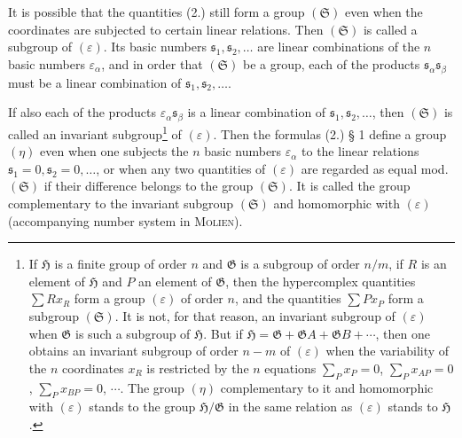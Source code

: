 \documentclass[11pt]{article}
\newcommand{\eps}{\varepsilon}
\begin{document}
It is possible that the quantities (2.) still form a group $(\mathfrak S)$ even when the coordinates are subjected to certain linear relations. Then $(\mathfrak S)$ is called a subgroup of $(\eps)$. Its basic numbers $\mathfrak s_1,\mathfrak s_2,\ldots$ are linear combinations of the $n$ basic numbers $\eps_\alpha$, and in order that $(\mathfrak S)$ be a group, each of the products $\mathfrak s_\alpha\mathfrak s_\beta$ must be a linear combination of $\mathfrak s_1,\mathfrak s_2,\ldots$.

If also each of the products $\eps_\alpha\mathfrak s_\beta$ is a linear combination of $\mathfrak s_1,\mathfrak s_2,\ldots$, then $(\mathfrak S)$ is called an invariant subgroup\footnote{If $\mathfrak H$ is a finite group of order $n$ and $\mathfrak G$ is a subgroup of order $n/m$, if $R$ is an element of $\mathfrak H$ and $P$ an element of $\mathfrak G$, then the hypercomplex quantities $\sum R x_R$ form a group $(\eps)$ of order $n$, and the quantities $\sum P x_P$ form a subgroup $(\mathfrak S)$. It is not, for that reason, an invariant subgroup of $(\eps)$ when $\mathfrak G$ is such a subgroup of $\mathfrak H$. But if $\mathfrak H=\mathfrak G+\mathfrak G A+\mathfrak G B+\cdots$, then one obtains an invariant subgroup of order $n-m$ of $(\eps)$ when the variability of the $n$ coordinates $x_R$ is restricted by the $n$ equations $\sum_P x_P=0$, $\sum_P x_{AP}=0$, $\sum_P x_{BP}=0$, $\cdots$. The group $(\eta)$ complementary to it and homomorphic with $(\eps)$ stands to the group $\mathfrak H/\mathfrak G$ in the same relation as $(\eps)$ stands to $\mathfrak H$.} of $(\eps)$. Then the formulas (2.) § 1 define a group $(\eta)$ even when one subjects the $n$ basic numbers $\eps_\alpha$ to the linear relations $\mathfrak s_1=0,\mathfrak s_2=0,\ldots$, or when any two quantities of $(\eps)$ are regarded as equal mod. $(\mathfrak S)$ if their difference belongs to the group $(\mathfrak S)$. It is called the group complementary to the invariant subgroup $(\mathfrak S)$ and homomorphic with $(\eps)$ (accompanying number system in \textsc{Molien}).
\end{document}
